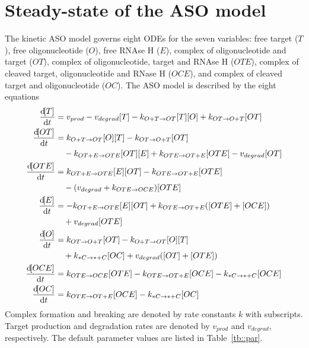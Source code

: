 \documentclass[a4paper,11pt]{article}
\newcommand{\kmo}{k_{OT \to O+T}}
\newcommand{\ko}{k_{O+T \to OT}}
\newcommand{\kmt}{k_{OTE \to OT+E}}
\newcommand{\kt}{k_{OT+E \to OTE}}
\newcommand{\kE}{k_{OTE \to OCE}}
\newcommand{\kD}{k_{*C \to *+C}}
\newcommand{\vp}{v_{prod}}
\newcommand{\vd}{v_{degrad}}
\begin{document}
\section{Steady-state of the ASO model }
The kinetic ASO model governs eight ODEs for the seven variables: free target ($T$), free oligonucleotide ($O$), free RNAse H ($E$), complex of oligonucleotide and target ($OT$), complex of oligonucleotide, target and RNAse H  ($OTE$), complex of cleaved target, oligonucleotide and RNase H ($OCE$), and complex of cleaved target and oligonucleotide  ($OC$). The ASO model is described by the eight equations
\begin{align}
\frac{\dif [T]}{\dif t} &= \vp - \vd [T]-k_{O+T \to OT} [T] [O] +k_{OT\to O+T } [OT] \\
\frac{\dif [OT]}{\dif t} &= \ko[O][T]-\kmo[OT] \nonumber \\
	& \quad -\kt[OT][E]+\kmt [OTE]-\vd[OT] \\
\frac{\dif [OTE]}{\dif t} &= \kt[E][OT]-\kmt[OTE] \nonumber \\
	& \quad -(\vd+\kE)[OTE]\\
\frac{\dif [E]}{\dif t} &= -\kt[E][OT]+\kmt([OTE]+[OCE]) \nonumber \\
	& \quad+\vd[OTE]\\
\frac{\dif [O]}{\dif t}&= \kmo [OT]-\ko[O][T] \nonumber \\
	& \quad +\kD [OC]+\vd([OT]+[OTE])  \\
\frac{\dif [OCE]}{\dif t}& = \kE [OTE]-\kmt [OCE]-\kD [OCE] \\
\frac{\dif [OC]}{\dif t}& = \kmt [OCE]-\kD [OC]
\end{align}
Complex formation and breaking are denoted by rate constants $k$ with subscripts. Target production and degradation rates are denoted by $\vp$ and $\vd$, respectively. The default parameter values are listed in Table~\ref{tb::par}.
\end{document}
